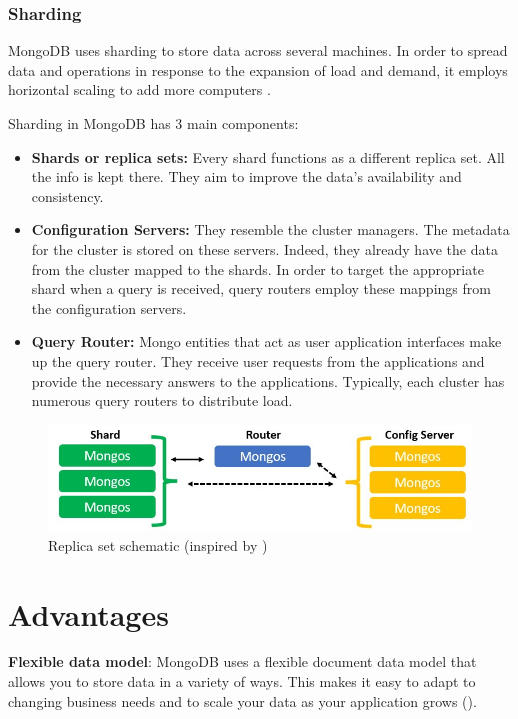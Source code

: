\subsubsection{Sharding}

MongoDB uses sharding to store data across several machines. In order to spread data and operations in response to the expansion of load and demand, it employs horizontal scaling to add more computers \parencite{roy_databases_2020}.

Sharding in MongoDB has 3 main components:

\begin{itemize}
    \item \textbf{Shards or replica sets:} Every shard functions as a different replica set. All the info is kept there. They aim to improve the data's availability and consistency.
    \item \textbf{Configuration Servers:} They resemble the cluster managers. The metadata for the cluster is stored on these servers. Indeed, they already have the data from the cluster mapped to the shards. In order to target the appropriate shard when a query is received, query routers employ these mappings from the configuration servers.
    \item \textbf{Query Router:} Mongo entities that act as user application interfaces make up the query router. They receive user requests from the applications and provide the necessary answers to the applications. Typically, each cluster has numerous query routers to distribute load.
\end{itemize}

\begin{figure}[H]
    \centering
    \caption{Replica set schematic (inspired by \textcite{mongodb_sharding})} \label{fig:Sharding}
    \includegraphics[width=\textwidth]{images/sharding.jpeg}
\end{figure}

\section{Advantages}

\textbf{Flexible data model}: MongoDB uses a flexible document data model that allows you to store data in a variety of ways. This makes it easy to adapt to changing business needs and to scale your data as your application grows (\cites{mongodb-datamodels}{knowledgenile-pro-con}).

